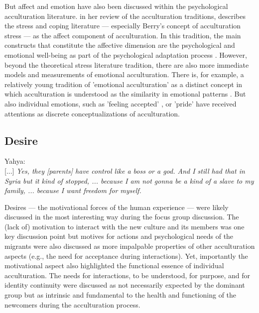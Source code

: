 \documentclass[man, 12pt, a4paper]{apa7}
\begin{document}
But affect and emotion have also been discussed within the psychological acculturation literature. \citet{Ward2001} in her review of the acculturation traditions, describes the stress and coping literature --- especially Berry's concept of acculturation stress \citep{Berry1997b} --- as the affect component of acculturation. In this tradition, the main constructs that constitute the affective dimension are the psychological and emotional well-being as part of the psychological adaptation process \citep[including, for example life satisfaction and depression;][]{Ward2019}. However, beyond the theoretical stress literature tradition, there are also more immediate models and measurements of emotional acculturation. There is, for example, a relatively young tradition of 'emotional acculturation' as a distinct concept in which acculturation is understood as the similarity in emotional patterns \citep[see][for a review]{DeLeersnyder2017}. But also individual emotions, such as 'feeling accepted' \citep{Jasini2018}, or 'pride' \citep{Suinn1995} have received attentions as discrete conceptualizations of acculturation. 

\subsection{Desire}
\begin{displayquote}
    Yahya:\\
    {[...]} \textit{Yes, they [parents] have control like a boss or a god. And I still had that in Syria but it kind of stopped, ... because I am not gonna be a kind of a slave to my family, ... because I want freedom for myself.}
\end{displayquote}

Desires --- the motivational forces of the human experience --- were likely discussed in the most interesting way during the focus group discussion. The (lack of) motivation to interact with the new culture and its members was one key discussion point but motives for actions and psychological needs of the migrants were also discussed as more impalpable properties of other acculturation aspects (e.g., the need for acceptance during interactions). Yet, importantly the motivational aspect also highlighted the functional essence of individual acculturation. The needs for interactions, to be understood, for purpose, and for identity continuity were discussed as not necessarily expected by the dominant group but as intrinsic and fundamental to the health and functioning of the newcomers during the acculturation process.
\end{document}

